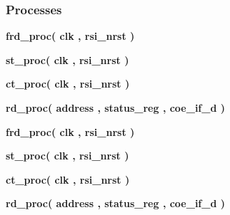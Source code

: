 \subsubsection*{Processes}
 \begin{DoxyCompactItemize}
\item 
{\bf frd\+\_\+proc}{\bfseries  ( {\bfseries {\bfseries {\bf clk}} \textcolor{vhdlchar}{ }} , {\bfseries {\bfseries {\bf rsi\+\_\+nrst}} \textcolor{vhdlchar}{ }} )}
\item 
{\bf st\+\_\+proc}{\bfseries  ( {\bfseries {\bfseries {\bf clk}} \textcolor{vhdlchar}{ }} , {\bfseries {\bfseries {\bf rsi\+\_\+nrst}} \textcolor{vhdlchar}{ }} )}
\item 
{\bf ct\+\_\+proc}{\bfseries  ( {\bfseries {\bfseries {\bf clk}} \textcolor{vhdlchar}{ }} , {\bfseries {\bfseries {\bf rsi\+\_\+nrst}} \textcolor{vhdlchar}{ }} )}
\item 
{\bf rd\+\_\+proc}{\bfseries  ( {\bfseries {\bfseries {\bf address}} \textcolor{vhdlchar}{ }} , {\bfseries {\bfseries {\bf status\+\_\+reg}} \textcolor{vhdlchar}{ }} , {\bfseries {\bfseries {\bf coe\+\_\+if\+\_\+d}} \textcolor{vhdlchar}{ }} )}
\item 
{\bf frd\+\_\+proc}{\bfseries  ( {\bfseries {\bfseries {\bf clk}} \textcolor{vhdlchar}{ }} , {\bfseries {\bfseries {\bf rsi\+\_\+nrst}} \textcolor{vhdlchar}{ }} )}
\item 
{\bf st\+\_\+proc}{\bfseries  ( {\bfseries {\bfseries {\bf clk}} \textcolor{vhdlchar}{ }} , {\bfseries {\bfseries {\bf rsi\+\_\+nrst}} \textcolor{vhdlchar}{ }} )}
\item 
{\bf ct\+\_\+proc}{\bfseries  ( {\bfseries {\bfseries {\bf clk}} \textcolor{vhdlchar}{ }} , {\bfseries {\bfseries {\bf rsi\+\_\+nrst}} \textcolor{vhdlchar}{ }} )}
\item 
{\bf rd\+\_\+proc}{\bfseries  ( {\bfseries {\bfseries {\bf address}} \textcolor{vhdlchar}{ }} , {\bfseries {\bfseries {\bf status\+\_\+reg}} \textcolor{vhdlchar}{ }} , {\bfseries {\bfseries {\bf coe\+\_\+if\+\_\+d}} \textcolor{vhdlchar}{ }} )}
\end{DoxyCompactItemize}
